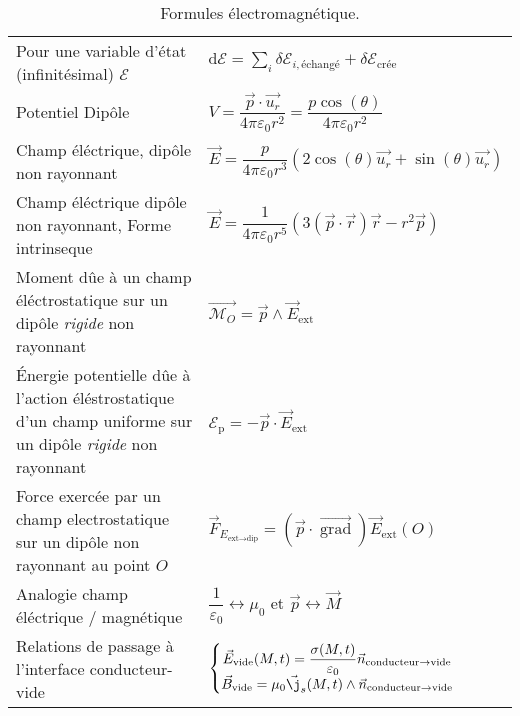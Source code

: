 \documentclass[10pt,a4paper,titlepage,portrait]{article}
\newcommand{\grad}
{
    \vec{\operatorname{grad}}
}
\begin{document}
\begin{center}
\begin{table}[ht]
\begin{tabular}{@{}p{9cm}p{10cm}@{}}
    Pour une variable d'état (infinitésimal) $\mathcal{E}$ & $\displaystyle \text{d} \mathcal{E} = \sum\limits_{i} \delta\mathcal{E}_{i, \text{échangé}} + \delta \mathcal{E}_{\text{crée}}$ \\ 
    Potentiel Dipôle & $V = \dfrac{\vec{p} \cdot \vec{u_r}}{4\pi \varepsilon_0 r^2} = \dfrac{p\cos(\theta)}{4\pi \varepsilon_0 r^2}$ \\ 
    Champ éléctrique, dipôle non rayonnant & $\vec{E} = \dfrac{p}{4\pi \varepsilon_0 r^3}(2\cos(\theta) \vec{u_r} + \sin(\theta) \vec{u_r})$ \\ 
    Champ éléctrique dipôle non rayonnant, Forme intrinseque & $\vec{E} = \dfrac{1}{4\pi\varepsilon_0 r^5}(3(\vec{p} \cdot \vec{r})\vec{r} - r^2\vec{p})$ \\ 
    Moment dûe à un champ éléctrostatique sur un dipôle \textit{rigide} non rayonnant & $\vec{\mathcal{M}_O}=\vec{p}\wedge \vec{E}_{\text{ext}}$ \\
    Énergie potentielle dûe à l'action éléstrostatique d'un champ uniforme sur un dipôle \textit{rigide} non rayonnant & $\mathcal{E}_{\text{p}} = -\vec{p}\cdot\vec{E}_{\text{ext}}$\\
    Force exercée par un champ electrostatique sur un dipôle non rayonnant au point $O$ & $\vec{F}_{E_{\text{ext}\longrightarrow\text{dip}}} = \left(\vec{p}\cdot\grad\right)\vec{E}_{\text{ext}}(O)$\\
    Analogie champ éléctrique $/$ magnétique & $\dfrac{1}{\varepsilon_0} \longleftrightarrow \mu_0$ et $\vec{p} \longleftrightarrow \vec{M}$ \\
    Relations de passage à l'interface conducteur-vide & $\left\{\begin{matrix} \vec{E}_{\text{vide}}(M,t) = \dfrac{\sigma(M,t)}{\varepsilon_0}\vec{n}_{\text{conducteur} \to \text{vide}} \\ \vec{B}_{\text{vide}} = \mu_0 \vec{\j}_s(M,t)\wedge \vec{n}_{\text{conducteur} \to \text{vide}}\end{matrix}\right.$ \\
    \bottomrule
\end{tabular}
\caption{Formules électromagnétique.}
\label{tab:electromag}
\end{table}



\end{center}
\end{document}
